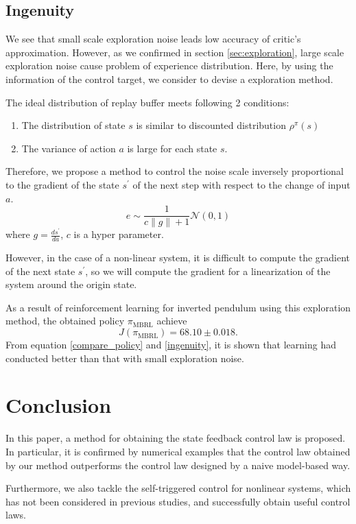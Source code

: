 \documentclass[english, dvipdfmx]{ampmt}             %
\begin{document}
\subsection{Ingenuity}
We see that small scale exploration noise leads low accuracy of critic's approximation. However, as we confirmed in section \ref{sec:exploration}, large scale exploration noise cause problem of experience distribution. Here, by using the information of the control target, we consider to devise a exploration method. \par
The ideal distribution of replay buffer meets following 2 conditions:
\begin{enumerate} 
	\item The distribution of state $s$ is similar to discounted distribution $\rho^{\pi}(s)$
	\item The variance of action $a$ is large for each state $s$.
\end{enumerate}
Therefore, we propose a method to control the noise scale inversely proportional to the gradient of the state $s^{\prime}$ of the next step with respect to the change of input $a$. 
\begin{equation}
	e \sim \frac{1}{c\|g\|+1} \mathcal{N}(0,1)
\end{equation}
where $g = \frac{ds^{\prime}}{da}$, $c$ is a hyper parameter. \par
However, in the case of a non-linear system, it is difficult to compute the gradient of the next state $s^{\prime}$, so we will compute the gradient for a linearization of the system around the origin state.\par
As a result of reinforcement learning for inverted pendulum using this exploration method, the obtained policy $\pi_{\textrm{MBRL}}$ achieve
\begin{equation}
	J(\pi_{\textrm{MBRL}}) = 68.10 \pm 0.018 \label{ingenuity}.
\end{equation}
From equation \eqref{compare_policy} and \eqref{ingenuity}, it is shown that learning had conducted better than that with small exploration noise.
\par


\section{Conclusion}
In this paper, a method for obtaining the state feedback control law is proposed. In particular, it is confirmed by numerical examples that the control law obtained by our method outperforms the control law designed by a naive model-based way. \par 
Furthermore, we also tackle the self-triggered control for nonlinear systems, which has not been considered in previous studies, and successfully obtain useful control laws. 
\end{document}

